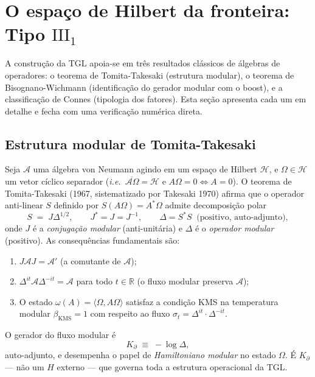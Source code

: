 \documentclass[12pt,a4paper]{article}
\newcommand{\Kpartial}{K_{\partial}}
\newcommand{\TGL}{\textsc{TGL}}
\begin{document}
\section{O espaço de Hilbert da fronteira: Tipo $\mathrm{III}_{1}$}
\label{sec:typeIII1}

A construção da \TGL{} apoia-se em três resultados clássicos de álgebras
de operadores: o teorema de Tomita-Takesaki (estrutura modular), o teorema
de Bisognano-Wichmann (identificação do gerador modular com o boost), e
a classificação de Connes (tipologia dos fatores).  Esta seção apresenta
cada um em detalhe e fecha com uma verificação numérica direta.

\subsection{Estrutura modular de Tomita-Takesaki}
\label{sec:tomita-takesaki}

Seja $\mathcal{A}$ uma álgebra von Neumann agindo em um espaço de Hilbert
$\mathcal{H}$, e $\Omega \in \mathcal{H}$ um vetor cíclico separador
(\textit{i.e.}\ $\overline{\mathcal{A}\Omega} = \mathcal{H}$ e
$A\Omega = 0 \Leftrightarrow A = 0$).  O teorema de Tomita-Takesaki
(1967, sistematizado por Takesaki 1970) afirma que o operador anti-linear
$S$ definido por $S(A\Omega) = A^{*}\Omega$ admite decomposição polar
\begin{equation}
S \;=\; J \Delta^{1/2},
\qquad J^{*} = J = J^{-1},
\qquad \Delta = S^{*}S \;\;\text{(positivo, auto-adjunto)},
\label{eq:tomita-decomp}
\end{equation}
onde $J$ é a \emph{conjugação modular} (anti-unitária) e $\Delta$ é o
\emph{operador modular} (positivo).  As consequências fundamentais são:
\begin{enumerate}[label=(\roman*)]
\item $J \mathcal{A} J = \mathcal{A}'$ (a comutante de $\mathcal{A}$);
\item $\Delta^{it} \mathcal{A} \Delta^{-it} = \mathcal{A}$ para todo $t \in \mathbb{R}$
(o fluxo modular preserva $\mathcal{A}$);
\item O estado $\omega(A) = \langle \Omega, A \Omega \rangle$ satisfaz
a condição KMS na temperatura modular $\beta_{\text{KMS}} = 1$ com respeito
ao fluxo $\sigma_t = \Delta^{it} \cdot \Delta^{-it}$.
\end{enumerate}
O gerador do fluxo modular é
\begin{equation}
\Kpartial \;\equiv\; -\log \Delta,
\label{eq:K-partial-definition}
\end{equation}
auto-adjunto, e desempenha o papel de \emph{Hamiltoniano modular} no estado
$\Omega$.  É $\Kpartial$ --- não um $H$ externo --- que governa toda a
estrutura operacional da \TGL{}.
\end{document}
